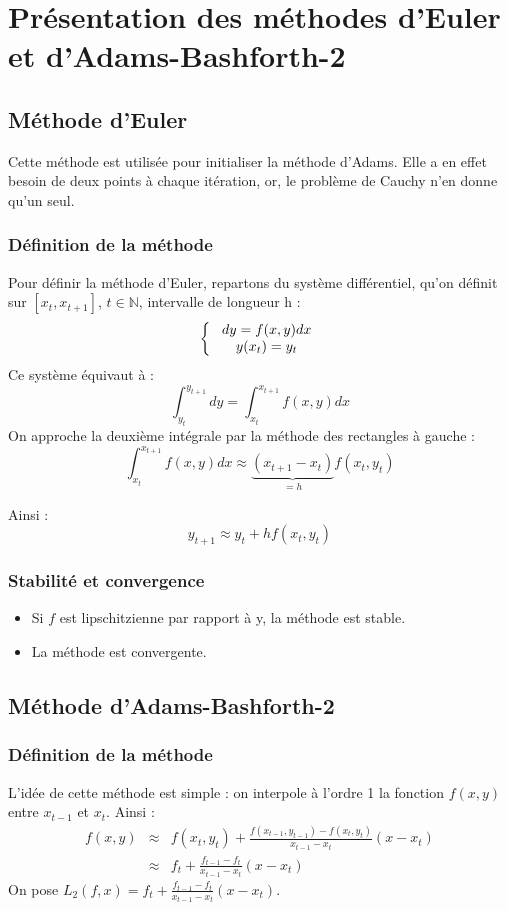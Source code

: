 \section{Présentation des méthodes d'Euler et d'Adams-Bashforth-2}
\subsection{Méthode d'Euler}
Cette méthode est utilisée pour initialiser la méthode d'Adams. Elle a en effet besoin de deux points à chaque itération, or, le problème de Cauchy n'en donne qu'un seul.
\subsubsection{Définition de la méthode}
Pour définir la méthode d'Euler, repartons du système différentiel, qu'on définit sur $[x_t,x_{t+1}]$, $t\in\mathbb{N}$, intervalle de longueur h :
\[\left\{ \begin{array}{c c c}
	dy = f(x,y) dx \\
	y(x_t)=y_t
\end{array}\right.\]
Ce système équivaut à :
\[\int_{y_t}^{y_{t+1}} dy = \int_{x_t}^{x_{t+1}} f(x,y) dx\]
On approche la deuxième intégrale par la méthode des rectangles à gauche :
\[\int_{x_t}^{x_{t+1}} f(x,y) dx \approx \underbrace{(x_{t+1}-x_t)}_{=h}f(x_t,y_t)\]

Ainsi :
\[y_{t+1} \approx y_t + hf(x_t,y_t)\]

\subsubsection{Stabilité et convergence}
\begin{itemize}
	\item Si $f$ est lipschitzienne par rapport à y, la méthode est stable.
	\item La méthode est convergente.
\end{itemize}

\subsection{Méthode d'Adams-Bashforth-2}
\subsubsection{Définition de la méthode}

L'idée de cette méthode est simple : on interpole à l'ordre 1 la fonction $f(x,y)$ entre $x_{t-1}$ et $x_t$. Ainsi :
\begin{eqnarray*}
f(x,y) &\approx& f(x_t,y_t)+\frac{f(x_{t-1},y_{t-1})-f(x_t,y_t)}{x_{t-1}-x_t}(x-x_t)\\
       &\approx& f_t + \frac{f_{t-1}-f_t}{x_{t-1}-x_t}(x-x_t)
\end{eqnarray*}
On pose $L_2(f,x)=f_t + \frac{f_{t-1}-f_t}{x_{t-1}-x_t}(x-x_t)$.


